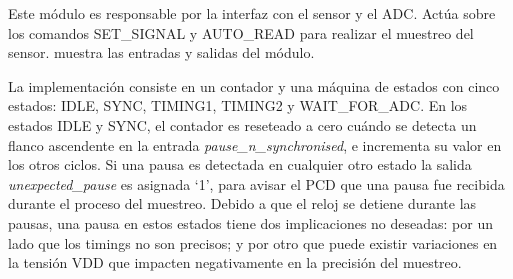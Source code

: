\documentclass[a4paper, twoside, 11pt]{report}
\begin{document}
Este módulo es responsable por la interfaz con el sensor y el ADC. Actúa sobre los comandos SET\_SIGNAL y AUTO\_READ para realizar el muestreo del sensor.  muestra las entradas y salidas del módulo.

La implementación consiste en un contador y una máquina de estados con cinco estados: IDLE, SYNC, TIMING1, TIMING2 y WAIT\_FOR\_ADC. En los estados IDLE y SYNC, el contador es reseteado a cero cuándo se detecta un flanco ascendente en la entrada \textit{pause\_n\_synchronised}, e incrementa su valor en los otros ciclos. Si una pausa es detectada en cualquier otro estado la salida \textit{unexpected\_pause} es asignada ‘1’, para avisar el PCD que una pausa fue recibida durante el proceso del muestreo. Debido a que el reloj se detiene durante las pausas, una pausa en estos estados tiene dos implicaciones no deseadas:  por un lado que los timings no son precisos; y por otro que puede existir variaciones en la tensión VDD que impacten negativamente en  la precisión del muestreo.
\end{document}
